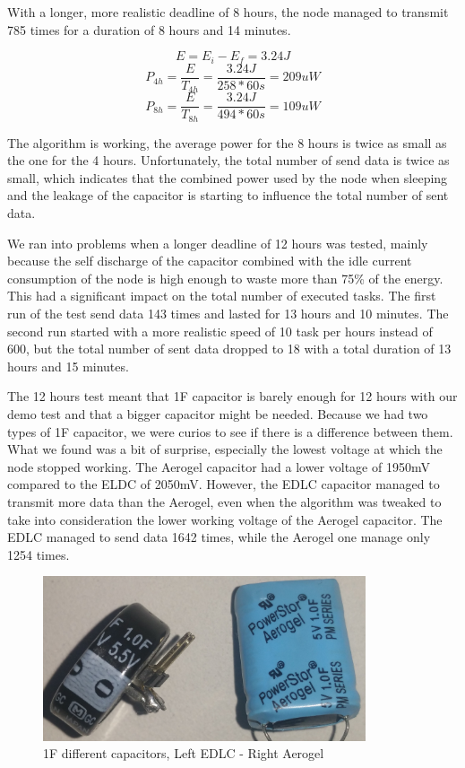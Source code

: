 With a longer, more realistic deadline of 8 hours, the node managed to transmit 785 times for a
duration of 8 hours and 14 minutes.

$$E = E_i - E_f = 3.24J$$
$$P_{4h} = \frac{E}{T_{4h}} = \frac{3.24J}{258 * 60s} = 209uW $$
$$P_{8h} = \frac{E}{T_{8h}} = \frac{3.24J}{494 * 60s} = 109uW $$

The algorithm is working, the average power for the 8 hours is twice as small as the one for the 4
hours. Unfortunately, the total number of send data is twice as small, which indicates that the
combined power used by the node when sleeping and the leakage of the capacitor is starting to
influence the total number of sent data.

We ran into problems when a longer deadline of 12 hours was tested, mainly because the self
discharge of the capacitor combined with the idle current
consumption of the node is high enough to waste more than 75\% of the energy. This had a significant
impact on the total number of executed tasks. The first run of the test send data 143 times and
lasted for 13 hours and 10 minutes. The second run started with a more realistic speed of 10 task
per hours instead of 600, but the total number of sent data dropped to 18 with a total duration of
13 hours and 15 minutes.

The 12 hours test meant that 1F capacitor is barely enough for 12 hours with our demo test and that
a bigger capacitor might be needed. Because we had two types of 1F capacitor, we were curios to
see if there is a difference between them. What we found was a bit of surprise, especially the
lowest voltage at which the node stopped working. The Aerogel capacitor had a lower voltage of 1950mV
compared to the ELDC of 2050mV. However, the EDLC capacitor managed to transmit more data than
the Aerogel, even when the algorithm was tweaked to take into consideration the lower working
voltage of the Aerogel capacitor. The EDLC managed to send data 1642 times, while the Aerogel one manage only
1254 times.

\begin{figure}[ht] \centering
\includegraphics[width=0.85\textwidth]{img/capacitors.jpg}
\caption{1F different capacitors, Left EDLC - Right Aerogel}
\end{figure}

